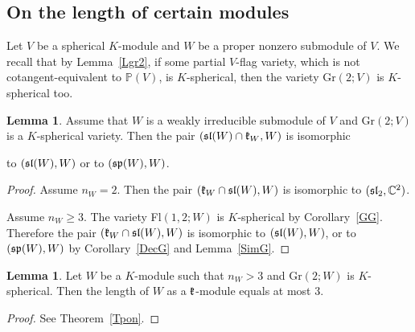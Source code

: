\documentclass[12pt]{amsart}
\theoremstyle{definition}\newtheorem{theorem}{Theorem}[section]
\newtheorem{lemma}[proposition]{Lemma}
\theoremstyle{definition}\newtheorem{definition}[proposition]{Definition}
\theoremstyle{remark}\newtheorem{example}[proposition]{Example}
\begin{document}
\subsection{On the length of certain modules} Let $V$ be a spherical $K$-module and $W$ be a proper nonzero submodule of $V$.%
We recall that by Lemma~\ref{Lgr2}, if some partial $V$-flag variety, which is not cotangent-equivalent to $\mathbb P(V)$, is $K$-spherical, then the variety Gr$(2; V)$ is $K$-spherical too.
\begin{lemma}\label{SPSL} Assume that $W$ is a weakly irreducible submodule of $V$ and Gr$(2; V)$ is a $K$-spherical variety. Then the pair $(\frak{sl}(W)\cap\frak k_W, W)$ is isomorphic \begin{center}to $(\frak{sl}(W), W)$ or to $(\frak{sp}(W), W)$.\end{center}\end{lemma}
\begin{proof}Assume $n_W=2$. Then the pair $(\frak k_W\cap\frak{sl}(W), W)$ is isomorphic to $(\frak{sl}_2, \mathbb C^2)$.

Assume $n_W\ge3$. The variety Fl$(1,2; W)$ is $K$-spherical by Corollary~\ref{GG}. Therefore the pair $(\frak k_W\cap\frak{sl}(W), W)$ is isomorphic to $(\frak{sl}(W), W)$, or to $(\frak{sp}(W), W)$ by Corollary~\ref{DecG} and Lemma~\ref{SimG}.\end{proof}
\begin{lemma}\label{<4}Let $W$ be a $K$-module such that $n_W>3$ and Gr$(2; W)$ is $K$-spherical. Then the length of $W$ as a $\frak k$-module equals at most 3.\end{lemma}
\begin{proof} See Theorem~\ref{Tpon}.\end{proof}
\end{document}
